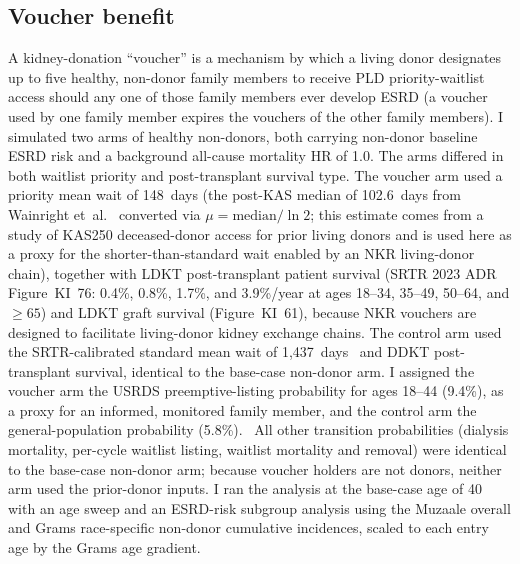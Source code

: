 \subsection{Voucher benefit}
\label{subsec:methods-voucher}
A kidney-donation ``voucher'' is a mechanism by which a living donor designates up to five healthy, non-donor family members to receive PLD priority-waitlist access should any one of those family members ever develop ESRD (a voucher used by one family member expires the vouchers of the other family members). I simulated two arms of healthy non-donors, both carrying non-donor baseline ESRD risk and a background all-cause mortality HR of 1.0. The arms differed in both waitlist priority and post-transplant survival type. The voucher arm used a priority mean wait of 148~days (the post-KAS median of 102.6~days from Wainright et~al.~\cite{wainright_impact_2017} converted via $\mu=\text{median}/\ln 2$; this estimate comes from a study of KAS250 deceased-donor access for prior living donors and is used here as a proxy for the shorter-than-standard wait enabled by an NKR living-donor chain), together with LDKT post-transplant patient survival (SRTR 2023 ADR Figure~KI~76: 0.4\%, 0.8\%, 1.7\%, and 3.9\%/year at ages 18--34, 35--49, 50--64, and $\geq 65$) and LDKT graft survival (Figure~KI~61), because NKR vouchers are designed to facilitate living-donor kidney exchange chains. The control arm used the SRTR-calibrated standard mean wait of 1{,}437~days~\cite{srtr_2023} and DDKT post-transplant survival, identical to the base-case non-donor arm. I assigned the voucher arm the USRDS preemptive-listing probability for ages 18--44 (9.4\%), as a proxy for an informed, monitored family member, and the control arm the general-population probability (5.8\%).~\cite{usrds_2025} All other transition probabilities (dialysis mortality, per-cycle waitlist listing, waitlist mortality and removal) were identical to the base-case non-donor arm; because voucher holders are not donors, neither arm used the prior-donor inputs. I ran the analysis at the base-case age of 40 with an age sweep and an ESRD-risk subgroup analysis using the Muzaale overall and Grams race-specific non-donor cumulative incidences, scaled to each entry age by the Grams age gradient.~\cite{muzaale_risk_2014,grams_kidney-failure_2016}

